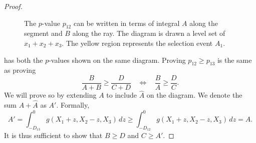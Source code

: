 \documentclass[11pt]{article}
\begin{document}
\begin{proof}
\begin{figure}[htbp]
\begin{center}
\end{center}
\caption{The $p$-value $p_{12}$ can be written in terms of integral $A$ along the segment and $B$ along the ray. The diagram is drawn a level set of $x_1 + x_2 + x_3$. The yellow region represents the selection event $A_1$.}
\label{fig:p-value}
\end{figure}

 has both the $p$-values shown on the same diagram. Proving $p_{12} \ge p_{13}$ is the same as proving
$$\frac{B}{A+B} \ge \frac{D}{C+D} ~~~~ \Longleftrightarrow ~~~~ \frac{B}{A} \ge \frac{D}{C}.$$
We will prove so by extending $A$ to include $\hat{A}$ on the diagram. We denote the sum $A + \hat{A}$ as $A'$. Formally,
\begin{equation}
A' = \int_{-D_{13}}^0 g\left(X_1 + z, X_2 - z, X_3\right) \,dz \ge \int_{-D_{12}}^0 g\left(X_1 + z, X_2 - z, X_3\right) \,dz = A.
\label{eqn:int_extension}
\end{equation}
It is thus sufficient to show that $B \ge D$ and $C \ge A'$.


\end{proof}
\end{document}

